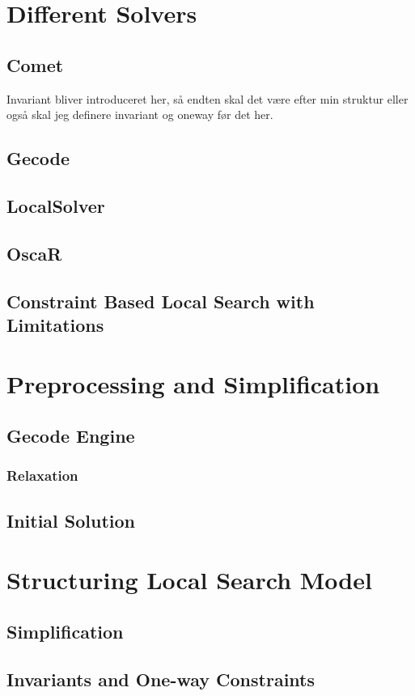 \documentclass[a4paper,10pt]{article}
\begin{document}
\section{Different Solvers }
\subsection{Comet}
Invariant bliver introduceret her, så endten skal det være efter min struktur eller også skal jeg definere invariant og 
oneway før det her. 
\subsection{Gecode}
\subsection{LocalSolver}
\subsection{OscaR}
\subsection{ Constraint Based Local Search with Limitations} %
\section{Preprocessing and Simplification}
\subsection{Gecode Engine}
\subsubsection{Relaxation}
\subsection{Initial Solution}
\section{Structuring Local Search Model}
\subsection{Simplification}
\subsection{Invariants and One-way Constraints}
\end{document}
